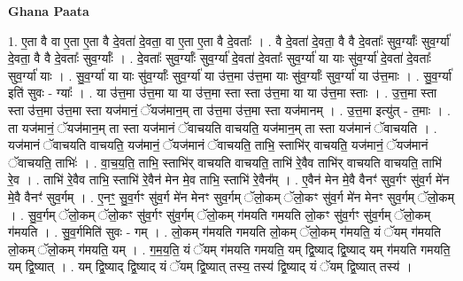 \documentclass[17pt]{extarticle}
\begin{document}
\textbf{Ghana Paata } \newline

1. ए॒ता वै वा ए॒ता ए॒ता वै दे॒वता॑ दे॒वता॒ वा ए॒ता ए॒ता वै दे॒वताः᳚ । . वै दे॒वता॑ दे॒वता॒ वै वै दे॒वताः᳚ सुव॒र्ग्याः᳚ सुव॒र्ग्या॑ दे॒वता॒ वै वै दे॒वताः᳚ सुव॒र्ग्याः᳚ । . दे॒वताः᳚ सुव॒र्ग्याः᳚ सुव॒र्ग्या॑ दे॒वता॑ दे॒वताः᳚ सुव॒र्ग्या॑ या याः सु॑व॒र्ग्या॑ दे॒वता॑ दे॒वताः᳚ सुव॒र्ग्या॑ याः । . सु॒व॒र्ग्या॑ या याः सु॑व॒र्ग्याः᳚ सुव॒र्ग्या॑ या उ॑त्त॒मा उ॑त्त॒मा याः सु॑व॒र्ग्याः᳚ सुव॒र्ग्या॑ या उ॑त्त॒माः । . सु॒व॒र्ग्या॑ इति॑ सुवः - ग्याः᳚ । . या उ॑त्त॒मा उ॑त्त॒मा या या उ॑त्त॒मा स्ता स्ता उ॑त्त॒मा या या उ॑त्त॒मा स्ताः । . उ॒त्त॒मा स्ता स्ता उ॑त्त॒मा उ॑त्त॒मा स्ता यज॑मानं॒ ॅयज॑मान॒म् ता उ॑त्त॒मा उ॑त्त॒मा स्ता यज॑मानम् । . उ॒त्त॒मा इत्यु॑त् - त॒माः । . ता यज॑मानं॒ ॅयज॑मान॒म् ता स्ता यज॑मानं ॅवाचयति वाचयति॒ यज॑मान॒म् ता स्ता यज॑मानं ॅवाचयति । . यज॑मानं ॅवाचयति वाचयति॒ यज॑मानं॒ ॅयज॑मानं ॅवाचयति॒ ताभि॒ स्ताभि॑र् वाचयति॒ यज॑मानं॒ ॅयज॑मानं ॅवाचयति॒ ताभिः॑ । . वा॒च॒य॒ति॒ ताभि॒ स्ताभि॑र् वाचयति वाचयति॒ ताभि॑ रे॒वैव ताभि॑र् वाचयति वाचयति॒ ताभि॑ रे॒व । . ताभि॑ रे॒वैव ताभि॒ स्ताभि॑ रे॒वैन॑ मेन मे॒व ताभि॒ स्ताभि॑ रे॒वैन᳚म् । . ए॒वैन॑ मेन मे॒वै वैनꣳ॑ सुव॒र्गꣳ सु॑व॒र्ग मे॑न मे॒वै वैनꣳ॑ सुव॒र्गम् । . ए॒नꣳ॒॒ सु॒व॒र्गꣳ सु॑व॒र्ग मे॑न मेनꣳ सुव॒र्गम् ॅलो॒कम् ॅलो॒कꣳ सु॑व॒र्ग मे॑न मेनꣳ सुव॒र्गम् ॅलो॒कम् । . सु॒व॒र्गम् ॅलो॒कम् ॅलो॒कꣳ सु॑व॒र्गꣳ सु॑व॒र्गम् ॅलो॒कम् ग॑मयति गमयति लो॒कꣳ सु॑व॒र्गꣳ सु॑व॒र्गम् ॅलो॒कम् ग॑मयति । . सु॒व॒र्गमिति॑ सुवः - गम् । . लो॒कम् ग॑मयति गमयति लो॒कम् ॅलो॒कम् ग॑मयति॒ यं ॅयम् ग॑मयति लो॒कम् ॅलो॒कम् ग॑मयति॒ यम् । . ग॒म॒य॒ति॒ यं ॅयम् ग॑मयति गमयति॒ यम् द्वि॒ष्याद् द्वि॒ष्याद् यम् ग॑मयति गमयति॒ यम् द्वि॒ष्यात् । . यम् द्वि॒ष्याद् द्वि॒ष्याद् यं ॅयम् द्वि॒ष्यात् तस्य॒ तस्य॑ द्वि॒ष्याद् यं ॅयम् द्वि॒ष्यात् तस्य॑ । \newline
\end{document}
